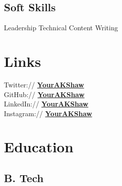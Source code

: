 \documentclass[]{deedy-resume-openfont}
\begin{document}
\begin{minipage}[t]{0.33\textwidth}
\subsection{Soft Skills}
Leadership \textbullet{} Technical Content Writing 
\sectionsep


\section{Links} 
Twitter:// \href{https://twitter.com/YourAKShaw}{\bf YourAKShaw} \\
GitHub://  \href{https://github.com/YourAKShaw}{\bf YourAKShaw} \\
LinkedIn://  \href{https://www.linkedin.com/in/YourAKShaw}{\bf YourAKShaw} \\
Instagram://  \href{https://www.instagram.com/YourAKShaw}{\bf YourAKShaw} \\


\section{Education} 


\subsection{B. Tech} 
\sectionsep




\end{minipage}
\end{document}
